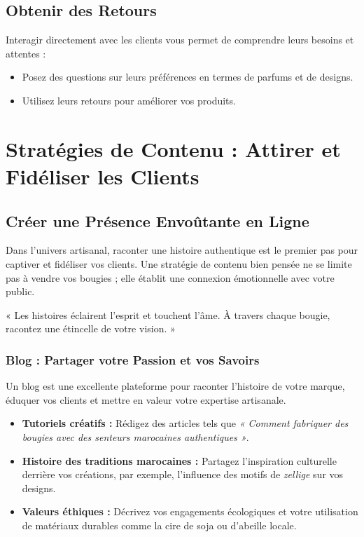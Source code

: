 \documentclass[11pt,fleqn,onecolumn,oneside]{book}
\begin{document}
\subsection*{Obtenir des Retours}

Interagir directement avec les clients vous permet de comprendre leurs besoins et attentes :
\begin{itemize}
    \item Posez des questions sur leurs préférences en termes de parfums et de designs.
    \item Utilisez leurs retours pour améliorer vos produits.
\end{itemize}


\section{Stratégies de Contenu : Attirer et Fidéliser les Clients}

\subsection*{Créer une Présence Envoûtante en Ligne}

Dans l'univers artisanal, raconter une histoire authentique est le premier pas pour captiver et fidéliser vos clients. Une stratégie de contenu bien pensée ne se limite pas à vendre vos bougies ; elle établit une connexion émotionnelle avec votre public.

\begin{remark}
« Les histoires éclairent l’esprit et touchent l’âme. À travers chaque bougie, racontez une étincelle de votre vision. »
\end{remark}

\subsubsection*{Blog : Partager votre Passion et vos Savoirs}

Un blog est une excellente plateforme pour raconter l’histoire de votre marque, éduquer vos clients et mettre en valeur votre expertise artisanale. 

\begin{itemize}
    \item \textbf{Tutoriels créatifs :} Rédigez des articles tels que \textit{« Comment fabriquer des bougies avec des senteurs marocaines authentiques »}.
    \item \textbf{Histoire des traditions marocaines :} Partagez l’inspiration culturelle derrière vos créations, par exemple, l’influence des motifs de \textit{zellige} sur vos designs.
    \item \textbf{Valeurs éthiques :} Décrivez vos engagements écologiques et votre utilisation de matériaux durables comme la cire de soja ou d’abeille locale.
\end{itemize}
\end{document}
